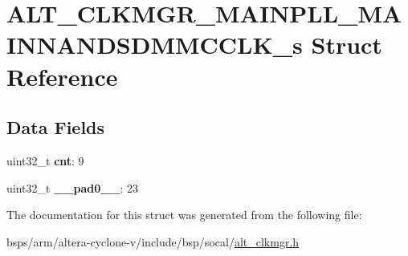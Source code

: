 \hypertarget{structALT__CLKMGR__MAINPLL__MAINNANDSDMMCCLK__s}{}\section{A\+L\+T\+\_\+\+C\+L\+K\+M\+G\+R\+\_\+\+M\+A\+I\+N\+P\+L\+L\+\_\+\+M\+A\+I\+N\+N\+A\+N\+D\+S\+D\+M\+M\+C\+C\+L\+K\+\_\+s Struct Reference}
\label{structALT__CLKMGR__MAINPLL__MAINNANDSDMMCCLK__s}
\subsection*{Data Fields}
\begin{DoxyCompactItemize}
\item 
\mbox{\label{structALT__CLKMGR__MAINPLL__MAINNANDSDMMCCLK__s_ae00b54595d100270f61165c61326c70f}} 
uint32\+\_\+t {\bfseries cnt}\+: 9
\item 
\mbox{\label{structALT__CLKMGR__MAINPLL__MAINNANDSDMMCCLK__s_a236c7db17f6b977d02e367a3d7d5d8ef}} 
uint32\+\_\+t {\bfseries \+\_\+\+\_\+pad0\+\_\+\+\_\+}\+: 23
\end{DoxyCompactItemize}


The documentation for this struct was generated from the following file\+:\begin{DoxyCompactItemize}
\item 
bsps/arm/altera-\/cyclone-\/v/include/bsp/socal/\mbox{\hyperlink{alt__clkmgr_8h}{alt\+\_\+clkmgr.\+h}}\end{DoxyCompactItemize}
